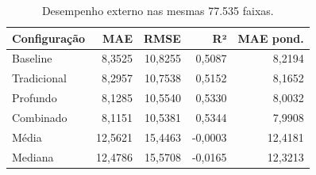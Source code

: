 \begin{table}[!htbp]\centering\small
\caption{Desempenho externo nas mesmas 77.535 faixas.}
\begin{tabularx}{\linewidth}{Xrrrr}
\toprule
Configuração & MAE & RMSE & R² & MAE pond. \\
\midrule
Baseline & 8,3525 & 10,8255 & 0,5087 & 8,2194 \\
Tradicional & 8,2957 & 10,7538 & 0,5152 & 8,1652 \\
Profundo & 8,1285 & 10,5540 & 0,5330 & 8,0032 \\
Combinado & 8,1151 & 10,5381 & 0,5344 & 7,9908 \\
Média & 12,5621 & 15,4463 & -0,0003 & 12,4181 \\
Mediana & 12,4786 & 15,5708 & -0,0165 & 12,3213 \\
\bottomrule\end{tabularx}
\par{}
\end{table}
